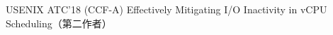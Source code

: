\cvpub
{USENIX ATC'18 (CCF-A)} %
{Effectively Mitigating I/O Inactivity in vCPU Scheduling（第二作者）} %
{} %
{} %
{ %
}
